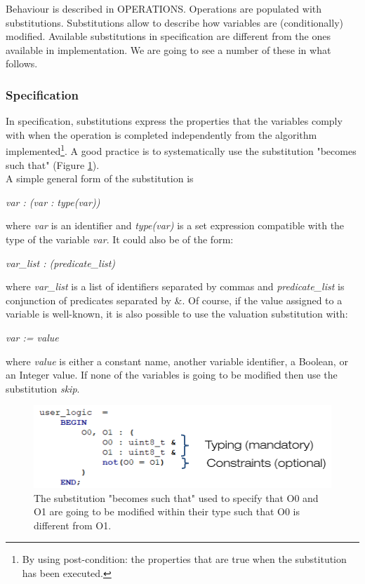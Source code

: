 Behaviour is described in OPERATIONS. Operations are populated with substitutions. Substitutions allow to describe how variables are (conditionally) modified. Available substitutions in specification are different from the ones available in implementation. We are going to see a number of these in what follows.

\subsubsection{Specification}

In specification, substitutions express the properties that the variables comply with  when the operation is completed independently from  the algorithm implemented\footnote{By using post-condition: the properties that are true when the substitution has been executed.}. A good practice is to systematically use the substitution "becomes such that" (Figure \ref{programming:subst-becomes-such-that}).\\ A simple general form of the substitution is 
\begin{center}
\textit{var : (var : type(var))}    
\end{center} where \textit{var} is an identifier and \textit{type(var)} is a set expression compatible with the type of the variable \textit{var}. It could  also be of the form:
\begin{center}
\textit{var\_list : (predicate\_list)}    
\end{center} where \textit{var\_list} is a list of identifiers separated by commas and \textit{predicate\_list} is conjunction of predicates separated by \&. Of course, if the value assigned to a variable is well-known, it is also possible to use the valuation substitution with:
\begin{center}
\textit{var := value}    
\end{center} where \textit{value} is either a constant name, another variable identifier, a Boolean, or an Integer value. If none of the variables is going to be modified then use the substitution \textit{skip}.

\begin{figure}[h]
\centering\includegraphics[scale=0.30]{Pictures/chapterProgramming/subst-becomes-such-that.png}
\caption{The substitution "becomes such that" used to specify that O0 and O1 are going to be modified within their type such that O0 is different from O1. }
\label{programming:subst-becomes-such-that}
\end{figure}  


